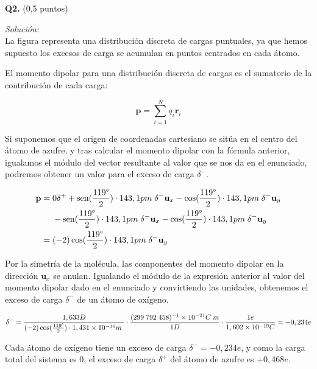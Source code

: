 \textbf{Q2.} (0,5 puntos)


\vspace{20px}
\textit{Solución:}
\\

La figura representa una distribución discreta de cargas puntuales, ya que hemos supuesto los excesos de carga se
acumulan en puntos centrados en cada átomo.

El momento dipolar para una distribución discreta de cargas es el sumatorio de la contribución de cada carga:

\begin{equation*}
    \mathbf{p} = \sum_{i = 1}^{N} q_i \mathbf{r}_i
\end{equation*}

Si suponemos que el origen de coordenadas cartesiano se sitúa en el centro del átomo de azufre, y tras calcular el momento
dipolar con la fórmula anterior, igualamos el módulo del vector resultante
al valor que se nos da en el enunciado, podremos obtener un valor para el exceso de carga $\delta^-$.

\begin{align*}
    \mathbf{p} =\; &
    0\delta^+ + \operatorname{sen}(\frac{119\degree}{2}) \cdot 143,1 pm\; \delta^- \mathbf{u}_x
    - \cos(\frac{119\degree}{2}) \cdot 143,1 pm\; \delta^- \mathbf{u}_y\\
    & - \operatorname{sen}(\frac{119\degree}{2}) \cdot 143,1 pm\; \delta^- \mathbf{u}_x
    - \cos(\frac{119\degree}{2}) \cdot 143,1 pm\; \delta^- \mathbf{u}_y \\
    =\; & (-2) \cos(\frac{119\degree}{2}) \cdot 143,1 pm\; \delta^- \mathbf{u}_y \
\end{align*}

Por la simetría de la molécula, las componentes del momento dipolar en la dirección $\mathbf{u}_x$ se anulan. Igualando
el módulo de la expresión anterior al valor del momento dipolar dado en el enunciado y convirtiendo las unidades, obtenemos
el exceso de carga $\delta^-$ de un átomo de oxígeno.


\begin{align*}
    \delta^- = \frac{1,633 D}{(-2) \cos(\frac{119\degree}{2}) \cdot 1,431 \times 10^{-10}m\;}
    \cdot \frac{(299\;792\;458)^{-1} \times 10^{-21}C\;m}{1D} \cdot \frac{1e}{1,602 \times 10^{-19}C} = -0,234e
\end{align*}

Cada átomo de oxígeno tiene un exceso de carga $\delta^- = -0,234e$, y como la carga total del sistema es 0, el exceso de carga
$\delta^+$ del átomo de azufre es $+0,468e$.